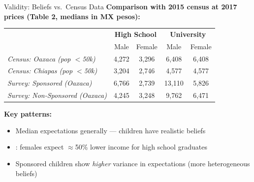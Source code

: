 \documentclass[aspectratio=169, 10pt]{beamer}
\begin{document}
\begin{frame}{Validity: Beliefs vs.\ Census Data}
  \textbf{Comparison with 2015 census at 2017 prices (Table 2, medians in MX pesos):}
  \begin{center}
  \begin{tabular}{lcccc}
    \toprule
    & \multicolumn{2}{c}{\textbf{High School}} & \multicolumn{2}{c}{\textbf{University}} \\
    & Male & Female & Male & Female \\
    \midrule
    \textit{Census: Oaxaca (pop $<$50k)} & 4,272 & 3,296 & 6,408 & 6,408 \\
    \textit{Census: Chiapas (pop $<$50k)} & 3,204 & 2,746 & 4,577 & 4,577 \\
    \midrule
    \textit{Survey: Sponsored (Oaxaca)}   & 6,766 & 2,739 & 13,110 & 5,826 \\
    \textit{Survey: Non-Sponsored (Oaxaca)} & 4,245 & 3,248 & 9,762 & 6,471 \\
    \bottomrule
  \end{tabular}
  \end{center}
  \vspace{0.3em}
  \textbf{Key patterns:}
  \begin{itemize}
    \item Median expectations generally  — children have realistic beliefs
    \item {}: females expect $\approx$50\% lower income for high school graduates
    \item Sponsored children show \textit{higher} variance in expectations (more heterogeneous beliefs)
  \end{itemize}
\end{frame}
\end{document}
